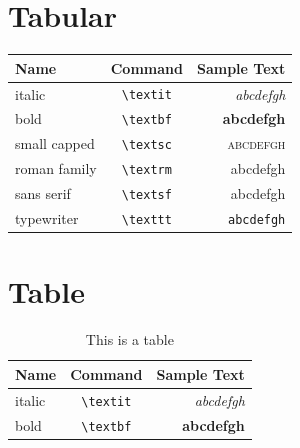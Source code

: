 \documentclass[12pt,twoside,a4paper]{article}
\begin{document}
\section{Tabular}
\begin{tabular}{|  l  ||  c  |||  r  ||||} %
\toprule
\textbf{Name} & \textbf{Command} & \textbf{Sample Text} \\
\midrule
italic        & \verb|\textit|  & \textit{abcdefgh}  \\ %
bold          & \verb|\textbf|  & \textbf{abcdefgh}  \\ %
small capped  & \verb|\textsc|  & \textsc{abcdefgh}  \\ %
roman family  & \verb|\textrm|  & \textrm{abcdefgh}  \\ %
sans serif    & \verb|\textsf|  & \textsf{abcdefgh}  \\ %
typewriter    & \verb|\texttt|  & \texttt{abcdefgh}  \\ %
\bottomrule
\end{tabular}



\section{Table}
\begin{table}[ht]
\centering
\begin{tabular}{|  l  ||  c  |||  r  ||||}
\toprule
\textbf{Name} & \textbf{Command} & \textbf{Sample Text} \\
\midrule
italic     &  \verb|\textit|   &  \textit{abcdefgh}     \\
bold       &  \verb|\textbf|   &  \textbf{abcdefgh}     \\
\bottomrule
\end{tabular}
\caption{This is a table}
\end{table}
\end{document}
